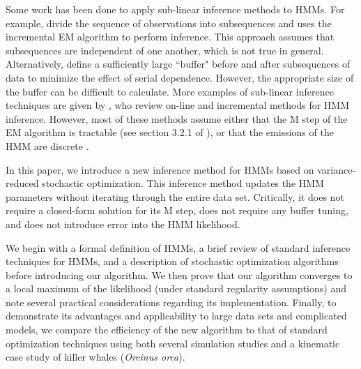 Some work has been done to apply sub-linear inference methods to HMMs.
For example, \citet{Gotoh:1998} divide the sequence of observations into subsequences
and uses the incremental EM algorithm to perform inference. This approach assumes that subsequences are independent of one another, which is not true in general. Alternatively, \citet{Ye:2017} define a sufficiently large ``buffer" before and after subsequences of data to minimize the effect of serial dependence. %
However, the appropriate size of the buffer can be difficult to calculate. %
More examples of sub-linear inference techniques are given by \citet{Khreich:2012}, who review on-line and incremental methods for HMM inference. However, most of these methods assume either that the M step of the EM algorithm is tractable (see section 3.2.1 of \citet{Khreich:2012}), or that the emissions of the HMM are discrete \citep{Baldi:1993}. 

In this paper, we introduce a new inference method for HMMs based on variance-reduced stochastic optimization. This inference method updates the HMM parameters without iterating through the entire data set. Critically, it does not require a closed-form solution for its M step, does not require any buffer tuning, and does not introduce error into the HMM likelihood.

We begin with a formal definition of HMMs, a brief review of standard inference techniques for HMMs, and a description of stochastic optimization algorithms before introducing our algorithm. We then prove that our algorithm converges to a local maximum of the likelihood (under standard regularity assumptions) and note several practical considerations regarding its implementation. Finally, to demonstrate its advantages and applicability to large data sets and complicated models, we compare the efficiency of the new algorithm to that of standard optimization techniques using both several simulation studies and a kinematic case study of killer whales ({\em{Orcinus orca}}).

